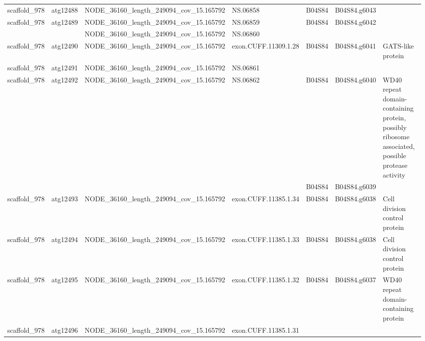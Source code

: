 \begin{longtable}{llllll}
   scaffold\_978 &  atg12488 &  NODE\_36160\_length\_249094\_cov\_15.165792 &              NS.06858 &       B04S84 &  B04S84.g6043 &                                                                                                  \\
   scaffold\_978 &  atg12489 &  NODE\_36160\_length\_249094\_cov\_15.165792 &              NS.06859 &       B04S84 &  B04S84.g6042 &                                                                                                  \\
                &           &  NODE\_36160\_length\_249094\_cov\_15.165792 &              NS.06860 &              &               &                                                                                                   \\
   scaffold\_978 &  atg12490 &  NODE\_36160\_length\_249094\_cov\_15.165792 &  exon.CUFF.11309.1.28 &       B04S84 &  B04S84.g6041 &                                                                                GATS-like protein \\
   scaffold\_978 &  atg12491 &  NODE\_36160\_length\_249094\_cov\_15.165792 &              NS.06861 &              &               &                                                                                                  \\
   scaffold\_978 &  atg12492 &  NODE\_36160\_length\_249094\_cov\_15.165792 &              NS.06862 &       B04S84 &  B04S84.g6040 &  WD40 repeat domain-containing protein, possibly ribosome associated, possible protease activity \\
                &           &                                         &                       &       B04S84 &  B04S84.g6039 &                                                                                                  &     \\
   scaffold\_978 &  atg12493 &  NODE\_36160\_length\_249094\_cov\_15.165792 &  exon.CUFF.11385.1.34 &       B04S84 &  B04S84.g6038 &                                                                    Cell division control protein \\
   scaffold\_978 &  atg12494 &  NODE\_36160\_length\_249094\_cov\_15.165792 &  exon.CUFF.11385.1.33 &       B04S84 &  B04S84.g6038 &                                                                    Cell division control protein \\
   scaffold\_978 &  atg12495 &  NODE\_36160\_length\_249094\_cov\_15.165792 &  exon.CUFF.11385.1.32 &       B04S84 &  B04S84.g6037 &                                                            WD40 repeat domain-containing protein \\
   scaffold\_978 &  atg12496 &  NODE\_36160\_length\_249094\_cov\_15.165792 &  exon.CUFF.11385.1.31 &              &               &                                                                                                  \\
\end{longtable}
